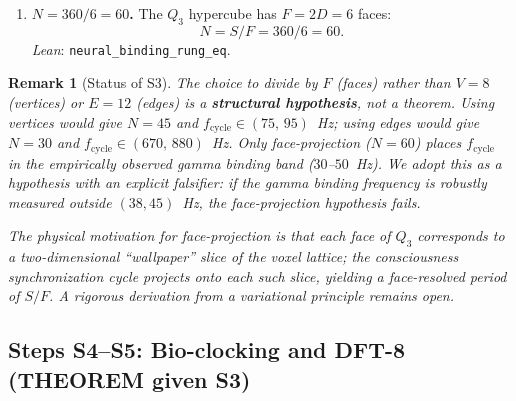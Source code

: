 \documentclass[11pt,a4paper]{article}
\newtheorem{remark}[theorem]{Remark}
\begin{document}
\begin{enumerate}[resume,label=\textbf{S\arabic*.}]
  \item \textbf{$N=360/6=60$.}
    The $Q_3$ hypercube has $F=2D=6$ faces:
    \begin{equation}
      \label{eq:rung}
      N = S / F = 360/6 = 60.
    \end{equation}
    \emph{Lean}: \texttt{neural\_binding\_rung\_eq}.
\end{enumerate}

\begin{remark}[Status of S3]
\label{rem:s3}
The choice to divide by $F$ (faces) rather than $V=8$ (vertices) or
$E=12$ (edges) is a \textbf{structural hypothesis}, not a theorem.
Using vertices would give $N=45$ and $f_{\mathrm{cycle}} \in
(75,\,95)$~Hz; using edges would give $N=30$ and
$f_{\mathrm{cycle}} \in (670,\,880)$~Hz. Only face-projection
($N=60$) places $f_{\mathrm{cycle}}$ in the empirically observed
gamma binding band ($30$--$50$~Hz). We adopt this as a hypothesis
with an explicit falsifier: if the gamma binding frequency is
robustly measured outside $(38,45)$~Hz, the face-projection
hypothesis fails.

The physical motivation for face-projection is that each face of
$Q_3$ corresponds to a two-dimensional ``wallpaper'' slice of the
voxel lattice; the consciousness synchronization cycle projects
onto each such slice, yielding a face-resolved period of $S/F$.
A rigorous derivation from a variational principle remains open.
\end{remark}

\subsection{Steps S4--S5: Bio-clocking and DFT-8 (THEOREM given S3)}
\end{document}

